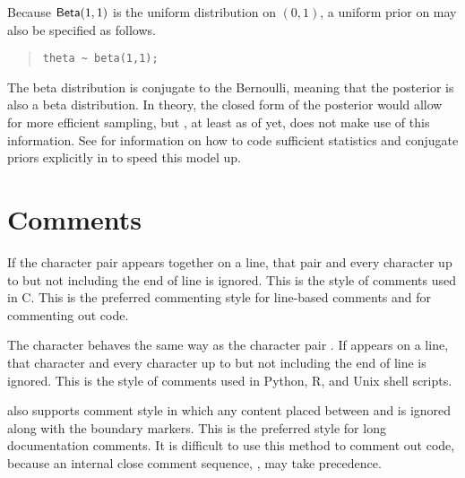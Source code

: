 Because $\mbox{\sf Beta}(1,1)$ is the uniform distribution on $(0,1)$,
a uniform prior on  may also be specified as follows.
%
\begin{quote}
\begin{Verbatim}
theta ~ beta(1,1);
\end{Verbatim}
\end{quote}
%
The beta distribution is conjugate to the Bernoulli, meaning that the
posterior is also a beta distribution.  In theory, the closed form of
the posterior would allow for more efficient sampling, but \Stan,
at least as of yet, does not make use of this information.  See
 for information on how to code sufficient
statistics and conjugate priors explicitly in \Stan to speed this model up.





\section{Comments}

If the character pair \code{//} appears together on a line, that pair 
and every character up to but not including the end of line is 
ignored.  This is the style of comments used in C.  This is the 
preferred commenting style for line-based comments and for commenting 
out code.

The character \code{\#} behaves the same way as the character pair
\code{//}.  If \code{#} appears on a line, that character and every
character up to but not including the end of line is ignored.  This is
the style of comments used in Python, R, and Unix shell scripts.  

\Stan also supports \Cpp comment style in which any content placed
between \code{/*} and \code{*/} is ignored along with the boundary
markers.  This is the preferred style for long documentation comments.
It is difficult to use this method to comment out code, because 
an internal close comment sequence, \code{*/}, may take precedence.





